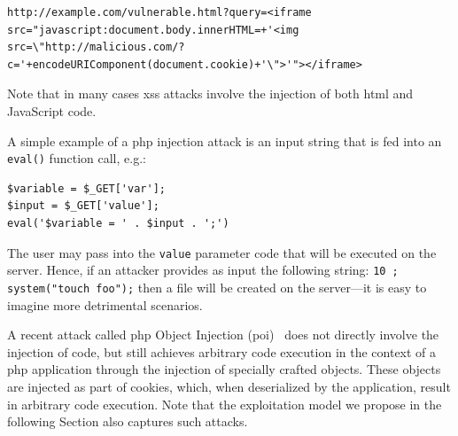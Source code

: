 \documentclass[10pt,journal,compsoc]{IEEEtran}
\begin{document}
\lstset{language=HTML}
\begin{lstlisting}
http://example.com/vulnerable.html?query=<iframe src="javascript:document.body.innerHTML=+'<img src=\"http://malicious.com/?c='+encodeURIComponent(document.cookie)+'\">'"></iframe>
\end{lstlisting}

\noindent
Note that in many cases {\sc xss} attacks
involve the injection of both {\sc html} and JavaScript code.

A simple example of a {\sc php} injection attack is an input string
that is fed into an {\tt eval()} function call, e.g.:

\lstset{language=PHP}
\begin{lstlisting}
$variable = $_GET['var']; 
$input = $_GET['value'];
eval('$variable = ' . $input . ';')
\end{lstlisting}

\noindent
The user may pass into the {\tt value} parameter code that will
be executed on the server. Hence, if an attacker provides as
input the following string: {\tt 10 ; system("touch foo");}
then a file will be created on the server---it is easy
to imagine more detrimental scenarios.

A recent attack called {\sc php} Object Injection
({\sc poi})~\cite{DKH14} does not directly involve
the injection of code, but still achieves arbitrary code execution
in the context of a {\sc php} application through the
injection of specially crafted objects.
These objects are injected as part of cookies,
which, when deserialized
by the application, result in arbitrary code execution.
Note that the exploitation model we propose
in the following Section also captures such attacks.
\end{document}
